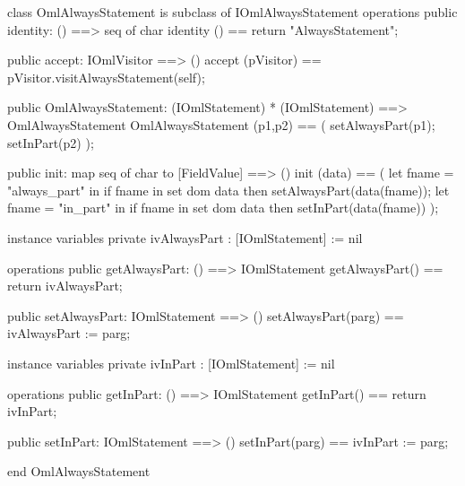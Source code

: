 \begin{vdm_al}
class OmlAlwaysStatement is subclass of IOmlAlwaysStatement
operations
  public identity: () ==> seq of char
  identity () == return "AlwaysStatement";

  public accept: IOmlVisitor ==> ()
  accept (pVisitor) == pVisitor.visitAlwaysStatement(self);

  public OmlAlwaysStatement:
      (IOmlStatement) *
      (IOmlStatement) ==> OmlAlwaysStatement
  OmlAlwaysStatement (p1,p2) == 
   ( setAlwaysPart(p1);
     setInPart(p2) );

  public init: map seq of char to [FieldValue] ==> ()
  init (data) ==
    ( let fname = "always_part" in
        if fname in set dom data
        then setAlwaysPart(data(fname));
      let fname = "in_part" in
        if fname in set dom data
        then setInPart(data(fname)) );

instance variables
  private ivAlwaysPart : [IOmlStatement] := nil

operations
  public getAlwaysPart: () ==> IOmlStatement
  getAlwaysPart() == return ivAlwaysPart;

  public setAlwaysPart: IOmlStatement ==> ()
  setAlwaysPart(parg) == ivAlwaysPart := parg;

instance variables
  private ivInPart : [IOmlStatement] := nil

operations
  public getInPart: () ==> IOmlStatement
  getInPart() == return ivInPart;

  public setInPart: IOmlStatement ==> ()
  setInPart(parg) == ivInPart := parg;

end OmlAlwaysStatement
\end{vdm_al}

